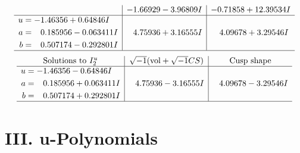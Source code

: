 \documentclass[1p]{elsarticle_modified}
\theoremstyle{definition}
\newcommand{\I}{\sqrt{-1}}
\begin{document}
$$\begin{array}{c|c|c}
 & -1.66929 - 3.96809 I & -0.71858 + 12.39534 I \\ \hline\begin{aligned}
u &= -1.46356 + 0.64846 I \\
a &= \phantom{-}0.185956 - 0.063411 I \\
b &= \phantom{-}0.507174 - 0.292801 I\end{aligned}
 & \phantom{-}4.75936 + 3.16555 I & \phantom{-}4.09678 + 3.29546 I\\
 \hline 
 \end{array}$$\newpage$$\begin{array}{c|c|c}  
\text{Solutions to }I^u_{2}& \I (\text{vol} + \sqrt{-1}CS) & \text{Cusp shape}\\
 \hline 
\begin{aligned}
u &= -1.46356 - 0.64846 I \\
a &= \phantom{-}0.185956 + 0.063411 I \\
b &= \phantom{-}0.507174 + 0.292801 I\end{aligned}
 & \phantom{-}4.75936 - 3.16555 I & \phantom{-}4.09678 - 3.29546 I\\
 \hline 
 \end{array}$$\newpage
\newpage\renewcommand{\arraystretch}{1}
\centering \section*{ III. u-Polynomials}
\end{document}
